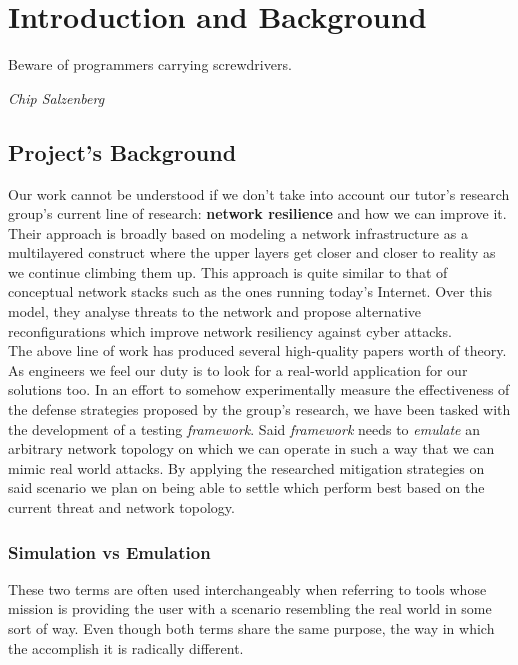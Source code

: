 \chapter{Introduction and Background}
    \epigraph{Beware of programmers carrying screwdrivers.}{\textit{Chip Salzenberg}}

    \section{Project's Background}
        Our work cannot be understood if we don't take into account our tutor's research group's current line of research: \textbf{network resilience} and how we can improve it. Their approach is broadly based on modeling a network infrastructure as a multilayered construct where the upper layers get closer and closer to reality as we continue climbing them up. This approach is quite similar to that of conceptual network stacks such as the ones running today's Internet. Over this model, they analyse threats to the network and propose alternative reconfigurations which improve network resiliency against cyber attacks.\\

        The above line of work has produced several high-quality papers worth of theory. As engineers we feel our duty is to look for a real-world application for our solutions too. In an effort to somehow experimentally measure the effectiveness of the defense strategies proposed by the group's research, we have been tasked with the development of a testing \textit{framework}. Said \textit{framework} needs to \textit{emulate} an arbitrary network topology on which we can operate in such a way that we can mimic real world attacks. By applying the researched mitigation strategies on said scenario we plan on being able to settle which perform best based on the current threat and network topology.\\

        \subsection{Simulation vs Emulation}
            These two terms are often used interchangeably when referring to tools whose mission is providing the user with a scenario resembling the real world in some sort of way. Even though both terms share the same purpose, the way in which the accomplish it is radically different.\\

